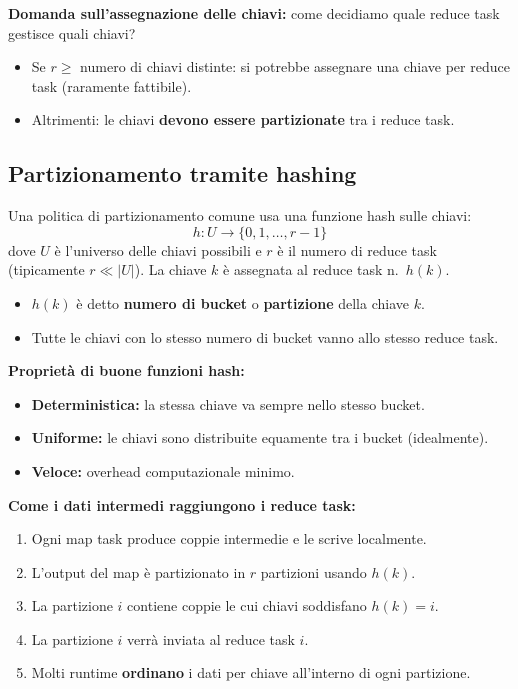 \textbf{Domanda sull'assegnazione delle chiavi:} come decidiamo quale reduce task
gestisce quali chiavi?
\begin{itemize}
  \item Se $r \geq$ numero di chiavi distinte: si potrebbe assegnare una
    chiave per reduce task (raramente fattibile).
  \item Altrimenti: le chiavi \textbf{devono essere partizionate} tra i
    reduce task.
\end{itemize}

\subsection{Partizionamento tramite hashing}

Una politica di partizionamento comune usa una funzione hash sulle chiavi:
\[
  h: U \to \{0, 1, \ldots, r-1\}
\]
dove $U$ è l'universo delle chiavi possibili e $r$ è il numero di reduce task
(tipicamente $r \ll |U|$). La chiave $k$ è assegnata al reduce task n.~$h(k)$.

\begin{itemize}
  \item $h(k)$ è detto \textbf{numero di bucket} o \textbf{partizione}
    della chiave $k$.
  \item Tutte le chiavi con lo stesso numero di bucket vanno allo stesso
    reduce task.
\end{itemize}

\textbf{Proprietà di buone funzioni hash:}
\begin{itemize}
  \item \textbf{Deterministica:} la stessa chiave va sempre nello stesso bucket.
  \item \textbf{Uniforme:} le chiavi sono distribuite equamente tra i bucket
    (idealmente).
  \item \textbf{Veloce:} overhead computazionale minimo.
\end{itemize}

\textbf{Come i dati intermedi raggiungono i reduce task:}
\begin{enumerate}
  \item Ogni map task produce coppie intermedie e le scrive localmente.
  \item L'output del map è partizionato in $r$ partizioni usando $h(k)$.
  \item La partizione $i$ contiene coppie le cui chiavi soddisfano $h(k) = i$.
  \item La partizione $i$ verrà inviata al reduce task $i$.
  \item Molti runtime \textbf{ordinano} i dati per chiave all'interno di ogni
    partizione.
\end{enumerate}


